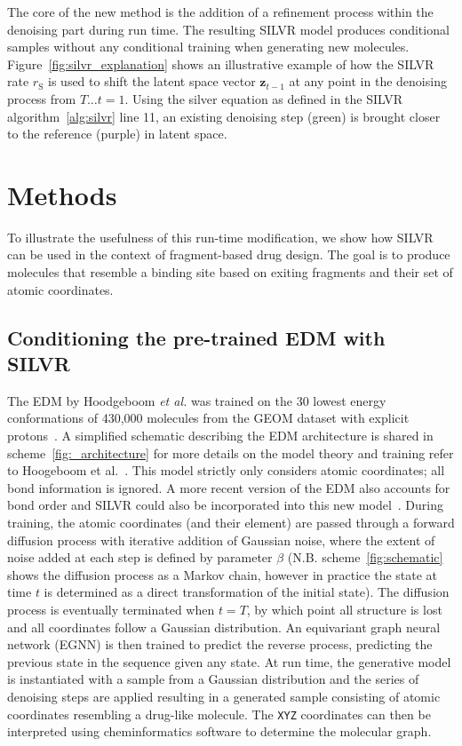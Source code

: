 \documentclass[journal=jacsat,manuscript=article]{achemso}
\begin{document}
The core of the new method is the addition of a refinement process within the denoising part during run time. The resulting SILVR model produces conditional samples without any conditional training when generating new molecules. Figure~\ref{fig:silvr_explanation} shows an illustrative example of how the SILVR rate $r_{\mathrm{S}}$ is used to shift the latent space vector $\mathbf{z}_{t-1}$ at any point in the denoising process from $T\ldots t=1$. Using the silver equation as defined in the SILVR algorithm~\ref{alg:silvr} line 11, an existing denoising step (green) is brought closer to the reference (purple) in latent space. 

\section{Methods}
To illustrate the usefulness of this run-time modification, we show how SILVR can be used in the context of fragment-based drug design. The goal is to produce molecules that resemble a binding site based on exiting fragments and their set of atomic coordinates. 

\subsection{Conditioning the pre-trained EDM with SILVR}
The EDM by Hoodgeboom \textit{et al.} was trained on the 30 lowest energy conformations of 430,000 molecules from the GEOM dataset with explicit protons~\cite{axelrod2022geom}. A simplified schematic describing the EDM architecture is shared in scheme~\ref{fig:_architecture} for more details on the model theory and training refer to Hoogeboom et al.~\cite{hoogeboom2022equivariant}. This model strictly only considers atomic coordinates; all bond information is ignored. A more recent version of the EDM also accounts for bond order and SILVR could also be incorporated into this new model~\cite{hvignac2023midi}. During training, the atomic coordinates (and their element) are passed through a forward diffusion process with iterative addition of Gaussian noise, where the extent of noise added at each step is defined by parameter $\beta$ (N.B. scheme~\ref{fig:schematic} shows the diffusion process as a Markov chain, however in practice the state at time $t$ is determined as a direct transformation of the initial state). The diffusion process is eventually terminated when $t=T$, by which point all structure is lost and all coordinates follow a Gaussian distribution. An equivariant graph neural network (EGNN) is then trained to predict the reverse process, predicting the previous state in the sequence given any state. At run time, the generative model is instantiated with a sample from a Gaussian distribution and the series of denoising steps are applied resulting in a generated sample consisting of atomic coordinates resembling a drug-like molecule. The \texttt{XYZ} coordinates can then be interpreted using cheminformatics software to determine the molecular graph. 
\end{document}

